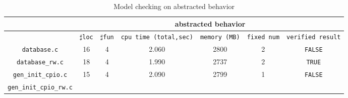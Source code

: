 \begin{table}
  \scriptsize
\begin{tabular}{|c|c|c|c|c|c|c|}
\hline
&\multicolumn{6}{|c|}{abstracted behavior} \\
\hline
 &$\sharp$\texttt{loc} & $\sharp$\texttt{fun} & \texttt{cpu time (total,sec)} & \texttt{memory (MB)} & \texttt{fixed num} & \texttt{verified result} \\
\hline
\texttt{database.c} &  16 & 4 & 2.060 & 2800 & 2 & \texttt{FALSE} \\
\hline
\texttt{database\_rw.c} &  18 & 4 & 1.990 & 2737 & 2 & \texttt{TRUE} \\
\hline
\texttt{gen\_init\_cpio.c} & 15 & 4 & 2.090 & 2799 & 1  & \texttt{FALSE}  \\
\hline
\texttt{gen\_init\_cpio\_rw.c} &  &  &  &  &   & \texttt{}  \\

\hline
\end{tabular}
\caption{Model checking on abstracted behavior}
\label{tb:mca}
\end{table}


